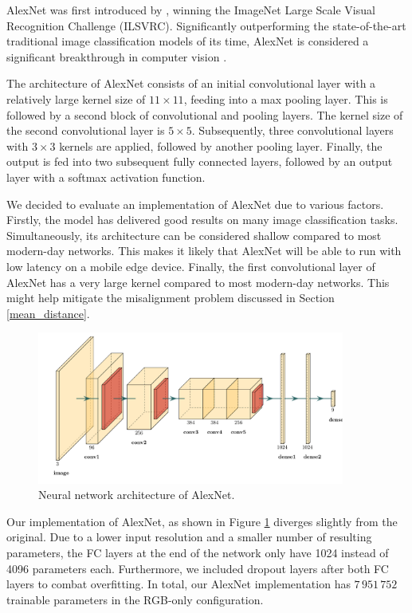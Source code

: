 \documentclass{l4proj}
\begin{document}
AlexNet was first introduced by \citet{krizhevsky_imagenet_2012}, winning the ImageNet Large Scale Visual Recognition Challenge (ILSVRC). Significantly outperforming the state-of-the-art traditional image classification models of its time, AlexNet is considered a significant breakthrough in computer vision \citep{alom_history_2018}.

The architecture of AlexNet consists of an initial convolutional layer with a relatively large kernel size of $11 \times 11$, feeding into a max pooling layer. This is followed by a second block of convolutional and pooling layers. The kernel size of the second convolutional layer is $5 \times 5$. Subsequently, three convolutional layers with $3 \times 3$ kernels are applied, followed by another pooling layer. Finally, the output is fed into two subsequent fully connected layers, followed by an output layer with a softmax activation function.

We decided to evaluate an implementation of AlexNet due to various factors. Firstly, the model has delivered good results on many image classification tasks. Simultaneously, its architecture can be considered shallow compared to most modern-day networks. This makes it likely that AlexNet will be able to run with low latency on a mobile edge device. Finally, the first convolutional layer of AlexNet has a very large kernel compared to most modern-day networks. This might help mitigate the misalignment problem discussed in Section \ref{mean_distance}.

\begin{figure}[ht]
  \centering
  \includegraphics[width=0.9\textwidth]{images/models/alexnet}
  \caption{Neural network architecture of AlexNet.}
  \label{fig:alexnet}
\end{figure}

Our implementation of AlexNet, as shown in Figure \ref{fig:alexnet} diverges slightly from the original. Due to a lower input resolution and a smaller number of resulting parameters, the FC layers at the end of the network only have 1024 instead of 4096 parameters each. Furthermore, we included dropout layers after both FC layers to combat overfitting. In total, our AlexNet implementation has $7\,951\,752$ trainable parameters in the RGB-only configuration.
\end{document}
